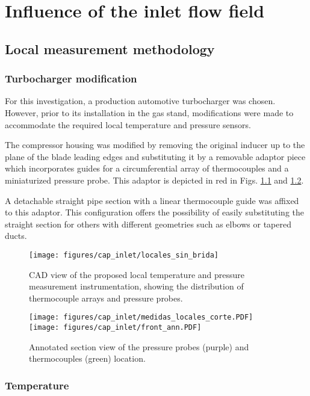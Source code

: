 \chapter{Influence of the inlet flow field}
\label{cap:inlet}

\section{Local measurement methodology}

\subsection{Turbocharger modification}
For this investigation, a production automotive turbocharger was chosen. However, prior to its installation in the gas stand, modifications were made to accommodate the required local temperature and pressure sensors.

The compressor housing was modified by removing the original inducer up to the plane of the blade leading edges and substituting it by a removable adaptor piece which incorporates guides for a circumferential array of thermocouples and a miniaturized pressure probe. This adaptor is depicted in red in Figs. \ref{fig:metod_local_meas} and \ref{fig:metod_local_meas_dimen}.

A detachable straight pipe section with a linear thermocouple guide was affixed to this adaptor. This configuration offers the possibility of easily substituting the straight section for others with different geometries such as elbows or tapered ducts.

\begin{figure}[htb!]
\centering
\texttt{[image: figures/cap\_inlet/locales\_sin\_brida]}
\caption{CAD view of the proposed local temperature and pressure measurement instrumentation, showing the distribution of thermocouple arrays and pressure probes.}
\label{fig:metod_local_meas}
\end{figure}

\begin{figure}[b!]
\centering
\texttt{[image: figures/cap\_inlet/medidas\_locales\_corte.PDF]}
\texttt{[image: figures/cap\_inlet/front\_ann.PDF]}
\caption{Annotated section view of the pressure probes (purple) and thermocouples (green) location.}
\label{fig:metod_local_meas_dimen}
\end{figure}

\subsection{Temperature}

